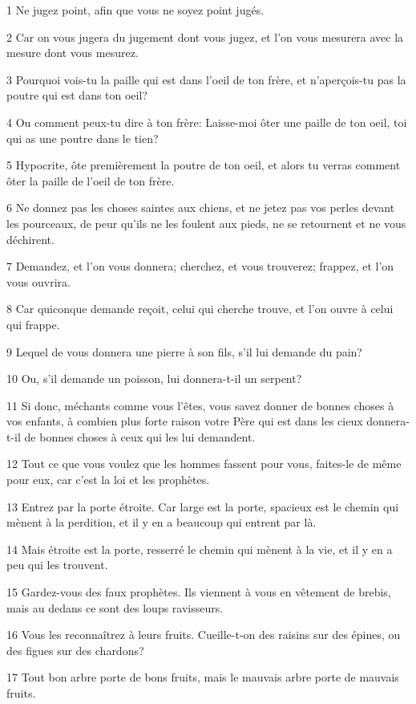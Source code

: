 \par 1 Ne jugez point, afin que vous ne soyez point jugés.
\par 2 Car on vous jugera du jugement dont vous jugez, et l'on vous mesurera avec la mesure dont vous mesurez.
\par 3 Pourquoi vois-tu la paille qui est dans l'oeil de ton frère, et n'aperçois-tu pas la poutre qui est dans ton oeil?
\par 4 Ou comment peux-tu dire à ton frère: Laisse-moi ôter une paille de ton oeil, toi qui as une poutre dans le tien?
\par 5 Hypocrite, ôte premièrement la poutre de ton oeil, et alors tu verras comment ôter la paille de l'oeil de ton frère.
\par 6 Ne donnez pas les choses saintes aux chiens, et ne jetez pas vos perles devant les pourceaux, de peur qu'ils ne les foulent aux pieds, ne se retournent et ne vous déchirent.
\par 7 Demandez, et l'on vous donnera; cherchez, et vous trouverez; frappez, et l'on vous ouvrira.
\par 8 Car quiconque demande reçoit, celui qui cherche trouve, et l'on ouvre à celui qui frappe.
\par 9 Lequel de vous donnera une pierre à son fils, s'il lui demande du pain?
\par 10 Ou, s'il demande un poisson, lui donnera-t-il un serpent?
\par 11 Si donc, méchants comme vous l'êtes, vous savez donner de bonnes choses à vos enfants, à combien plus forte raison votre Père qui est dans les cieux donnera-t-il de bonnes choses à ceux qui les lui demandent.
\par 12 Tout ce que vous voulez que les hommes fassent pour vous, faites-le de même pour eux, car c'est la loi et les prophètes.
\par 13 Entrez par la porte étroite. Car large est la porte, spacieux est le chemin qui mènent à la perdition, et il y en a beaucoup qui entrent par là.
\par 14 Mais étroite est la porte, resserré le chemin qui mènent à la vie, et il y en a peu qui les trouvent.
\par 15 Gardez-vous des faux prophètes. Ils viennent à vous en vêtement de brebis, mais au dedans ce sont des loups ravisseurs.
\par 16 Vous les reconnaîtrez à leurs fruits. Cueille-t-on des raisins sur des épines, ou des figues sur des chardons?
\par 17 Tout bon arbre porte de bons fruits, mais le mauvais arbre porte de mauvais fruits.
